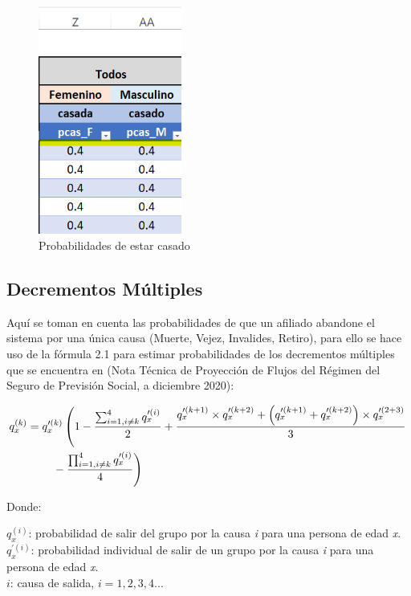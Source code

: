\documentclass[
  letterpaper,
  DIV=11,
  numbers=noendperiod]{scrreprt}
\begin{document}
\begin{figure}

{\centering \includegraphics[width=1.85417in,height=\textheight]{images/F/Img6.png}

}

\caption{Probabilidades de estar casado}

\end{figure}

\hypertarget{decrementos-muxfaltiples}{%
\subsection{Decrementos Múltiples}\label{decrementos-muxfaltiples}}

Aquí se toman en cuenta las probabilidades de que un afiliado abandone
el sistema por una única causa (Muerte, Vejez, Invalides, Retiro), para
ello se hace uso de la fórmula 2.1 para estimar probabilidades de los
decrementos múltiples que se encuentra en (Nota Técnica de Proyección de
Flujos del Régimen del Seguro de Previsión Social, a diciembre 2020):

\begin{align} q_x^{(k)} &= q_x^{\prime(k)} \left( 1-\frac{\sum_{i=1,i\neq k}^{4}q_x^{\prime(i)}}{2} + \frac{q_x^{\prime(k+1)}\times q_x^{\prime(k+2)}+\left(q_x^{\prime(k+1)}+q_x^{\prime(k+2)}\right)\times q_x^{\prime(2+3)}}{3}\right.\nonumber  \\ &\qquad \left.\vphantom{\int_t} -\frac{\prod_{i=1,i\neq k}^{4}q_x^{\prime(i)}}{4} \right) \end{align}

Donde:

\(q_x^{(i)}\): probabilidad de salir del grupo por la causa \emph{i}
para una persona de edad \emph{x}.\\
\(q_x^{\prime(i)}\): probabilidad individual de salir de un grupo por la
causa \emph{i} para una persona de edad \emph{x}.\\
\(i\): causa de salida, \(i=1,2,3,4...\)
\end{document}
